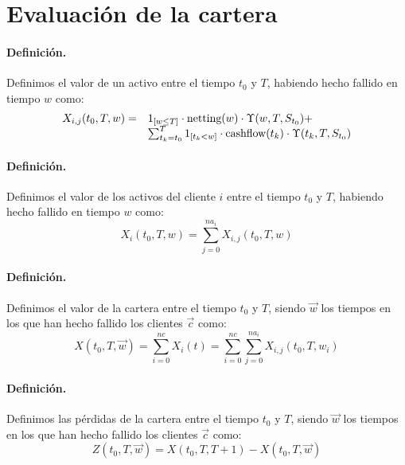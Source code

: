 
\section{Evaluaci\'on de la cartera}

\paragraph{Definici\'on.} Definimos el valor de un activo entre el tiempo
$t_0$ y $T$, habiendo hecho fallido en tiempo $w$ como:
\begin{equation}
\begin{array}{rl}
X_{i,j}(t_0,T,w) = & \textrm{1}_{[w \leq T]} \cdot \textrm{netting}(w) \cdot \Upsilon(w,T,S_{t_0}) + \cr
                   & \sum_{t_k=t_0}^{T} \textrm{1}_{[t_k < w]} \cdot \textrm{cashflow}(t_k) \cdot \Upsilon(t_k,T,S_{t_0})
\end{array}
\end{equation}

\paragraph{Definici\'on.} Definimos el valor de los activos del cliente $i$
entre el tiempo $t_0$ y $T$, habiendo hecho fallido en tiempo $w$ como:
\begin{equation}
X_i(t_0,T,w) = \sum_{j=0}^{na_i} X_{i,j}(t_0,T,w)
\end{equation}

\paragraph{Definici\'on.} Definimos el valor de la cartera entre el tiempo 
$t_0$ y $T$, siendo $\vec{w}$ los tiempos en los que han hecho fallido 
los clientes $\vec{c}$ como:
\begin{equation}
X(t_0,T,\vec{w}) = \sum_{i=0}^{nc} X_i(t) = \sum_{i=0}^{nc} \sum_{j=0}^{na_i} X_{i,j}(t_0,T,w_i)
\end{equation}

\paragraph{Definici\'on.} Definimos las p\'erdidas de la cartera entre el 
tiempo $t_0$ y $T$, siendo $\vec{w}$ los tiempos en los que han hecho fallido 
los clientes $\vec{c}$ como:
\begin{equation}
Z(t_0,T,\vec{w}) = X(t_0,T,T+1) - X(t_0,T,\vec{w})
\end{equation}

